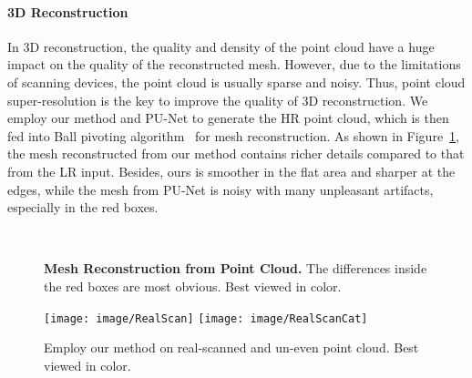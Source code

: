 \documentclass[10pt,twocolumn,letterpaper]{article}
\begin{document}
\paragraph{3D Reconstruction}
In 3D reconstruction, the quality and density of the point cloud have a huge impact on the quality of the reconstructed mesh.
However, due to the limitations of scanning devices, the point cloud is usually sparse and noisy.
Thus, point cloud super-resolution is the key to improve the quality of 3D reconstruction.
We employ our method and PU-Net to generate the HR point cloud, which is then fed into Ball pivoting algorithm~\cite{bernardini1999ball} for mesh reconstruction.
As shown in Figure~\ref{fig:mesh}, the mesh reconstructed from our method contains richer details compared to that from the LR input.
Besides, ours is smoother in the flat area and sharper at the edges, while the mesh from PU-Net is noisy with many unpleasant artifacts, especially in the red boxes.

\begin{figure}
\begin{center}
    \hfill
	\\
	\hfill
\end{center}
	\vspace{-1.5em}
	\caption{\textbf{Mesh Reconstruction from Point Cloud.} The differences inside the red boxes are most obvious. Best viewed in color.}
	\vspace{-1em}
	\label{fig:mesh}
\end{figure}

\begin{figure}
\begin{center}
    \texttt{[image: image/RealScan]}
    \hfill
    \texttt{[image: image/RealScanCat]}
\end{center}
	\vspace{-1.5em}
	\caption{Employ our method on real-scanned and un-even point cloud. Best viewed in color.}
	\vspace{-1em}
	\label{fig:real}
\end{figure}
\end{document}
